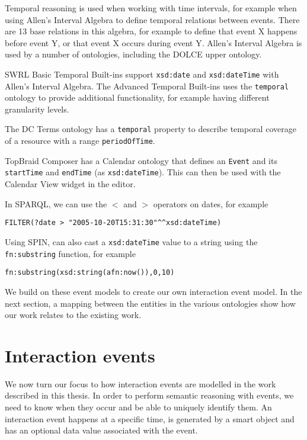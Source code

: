 Temporal reasoning is used when working with time intervals, for example when using Allen's Interval Algebra to define temporal relations between events. There are 13 base relations in this algebra, for example to define that event X happens before event Y, or that event X occurs during event Y. Allen's Interval Algebra is used by a number of ontologies, including the \ac{DOLCE} \cite{Scherp2011} upper ontology. 

\ac{SWRL} Basic Temporal Built-ins support \texttt{xsd:date} and \texttt{xsd:\-date\-Time} with Allen's Interval Algebra. The Advanced Temporal Built-ins uses the \texttt{temporal} ontology \cite{OConnor2010} to provide additional functionality, for example having different granularity levels.


The \ac{DC} Terms ontology has a \texttt{temporal} property to describe temporal coverage of a resource with a range \texttt{periodOfTime}.

TopBraid Composer has a Calendar ontology that defines an \texttt{Event} and its \texttt{startTime} and \texttt{endTime} (as \texttt{xsd:dateTime}). This can then be used with the Calendar View widget in the editor. 

In \ac{SPARQL}, we can use the $<$ and $>$ operators on dates, for example 

\begin{verbatim}
FILTER(?date > "2005-10-20T15:31:30"^^xsd:dateTime)
\end{verbatim}

Using \ac{SPIN}, can also cast a \texttt{xsd:dateTime} value to a string using the \texttt{fn:substring} function, for example

\begin{verbatim}
fn:substring(xsd:string(afn:now()),0,10)
\end{verbatim}

We build on these event models to create our own interaction event model. In the next section, a mapping between the entities in the various ontologies show how our work relates to the existing work.


\section{Interaction events}
\label{InteractionEvents}

We now turn our focus to how interaction events are modelled in the work described in this thesis. In order to perform semantic reasoning with events, we need to know when they occur and be able to uniquely identify them. An interaction event happens at a specific time, is generated by a smart object and has an optional data value associated with the event.

